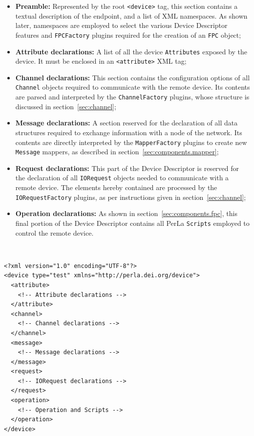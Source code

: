 \begin{itemize}

    \item \textbf{Preamble:} Represented by the root \lstinline!<device>! tag,
        this section contains a textual description of the endpoint, and a list
        of XML namespaces. As shown later, namespaces are employed to select
        the various Device Descriptor features and \texttt{FPCFactory} plugins
        required for the creation of an \texttt{FPC} object;

    \item \textbf{Attribute declarations:} A list of all the device
        \texttt{Attributes} exposed by the device. It must be enclosed in an
        \lstinline!<attribute>! XML tag;

    \item \textbf{Channel declarations:} This section contains the
        configuration options of all \texttt{Channel} objects required to
        communicate with the remote device. Its contents are parsed and
        interpreted by the \texttt{ChannelFactory} plugins, whose structure is
        discussed in section~\ref{sec:channel};

    \item \textbf{Message declarations:} A section reserved for the declaration
        of all data structures required to exchange information with a node of
        the network. Its contents are directly interpreted by the
        \texttt{MapperFactory} plugins to create new \texttt{Message}
        mappers, as described in section~\ref{sec:components.mapper};

    \item \textbf{Request declarations:} This part of the Device Descriptor is
        reserved for the declaration of all \texttt{IORequest} objects needed
        to communicate with a remote device. The elements hereby contained are
        processed by the \texttt{IORequestFactory} plugins, as per instructions
        given in section~\ref{sec:channel};

    \item \textbf{Operation declarations:} As shown in
        section~\ref{sec:components.fpc}, this final portion of the Device
        Descriptor contains all PerLa \texttt{Scripts} employed to control the
        remote device.

\end{itemize}

~\\
\lstset{language=XML}
\begin{lstlisting}[caption={The skeleton of the new XML Device Descriptor.}]
<?xml version="1.0" encoding="UTF-8"?>
<device type="test" xmlns="http://perla.dei.org/device">
  <attribute>
    <!-- Attribute declarations -->
  </attribute>
  <channel>
    <!-- Channel declarations -->
  </channel>
  <message>
    <!-- Message declarations -->
  </message>
  <request>
    <!-- IORequest declarations -->
  </request>
  <operation>
    <!-- Operation and Scripts -->
  </operation>
</device>
\end{lstlisting}

